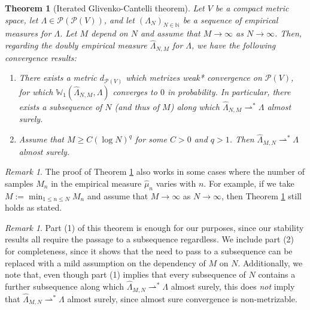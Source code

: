 \documentclass[aos, preprint]{imsart}
\theoremstyle{plain}
\newtheorem{theorem}{Theorem}[section]
\theoremstyle{remark}
\newtheorem{rem}[example]{Remark}
\begin{document}
{\begin{theorem}[Iterated Glivenko-Cantelli theorem]
\label{thm:iterated-glivenko-cantelli}
Let $V$ be a compact metric space, let $\Lambda\in\mathcal{P}(\mathcal{P}(V))$,
and let $(\Lambda_{N})_{N\in\mathbb{N}}$ be a sequence of empirical
measures for $\Lambda$. Let $M$ depend on $N$ and assume that $M\rightarrow\infty$
as $N\rightarrow\infty$. Then, regarding the doubly empirical measure
$\hat{\Lambda}_{N,M}$ for $\Lambda$, we have the following convergence
results:
\begin{enumerate}
\item There exists a metric $d_{\mathcal{P}(V)}$ which metrizes weak{*}
convergence on $\mathcal{P}(V)$, for which $\mathbb{W}_{1}(\hat{\Lambda}_{N,M},\Lambda)$
converges to $0$ in probability. In particular, there exists a subsequence
of $N$ (and thus of $M$) along which $\hat{\Lambda}_{N,M}\rightharpoonup^{*}\Lambda$
almost surely.
\item Assume that $M\geq C(\log N)^{q}$ for some $C>0$ and $q>1$. Then
$\hat{\Lambda}_{M,N}\rightharpoonup^{*}\Lambda$ almost surely.
\end{enumerate}
\end{theorem}

\begin{rem}
The proof of Theorem \ref{thm:iterated-glivenko-cantelli} also works in some cases where the number of samples $M_n$ in the empirical measure $\hat{\mu}_n$ varies with $n$. For example, if we take $M:=\min_{1\leq n \leq N}M_n$ and assume that $M\rightarrow\infty$ as $N\rightarrow \infty$, then Theorem \ref{thm:iterated-glivenko-cantelli} still holds as stated.
\end{rem}

\begin{rem}
Part (1) of this theorem is enough for our purposes, since our stability results all require the passage to a subsequence regardless. We include part (2) for completeness, since it shows that the need to pass to a subsequence can be replaced with a mild assumption on the dependency of $M$ on $N$. Additionally, we note that, even though part (1) implies that every subsequence of $N$ contains a further subsequence along which $\hat{\Lambda}_{M,N}\rightharpoonup^{*}\Lambda$ almost surely, this does \emph{not} imply that $\hat{\Lambda}_{M,N}\rightharpoonup^{*}\Lambda$ almost surely, since almost sure convergence is non-metrizable.
\end{rem}

}
\end{document}
